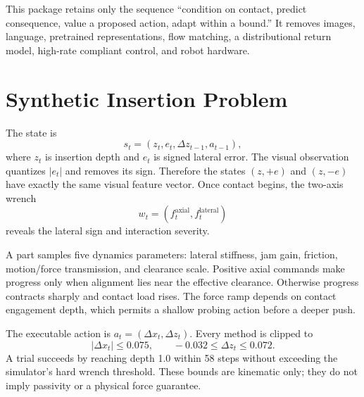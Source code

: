 \documentclass[11pt]{article}
\begin{document}
This package retains only the sequence ``condition on contact, predict consequence, value a proposed action, adapt within a bound.'' It removes images, language, pretrained representations, flow matching, a distributional return model, high-rate compliant control, and robot hardware.

\section{Synthetic Insertion Problem}
The state is
\[
  s_t = (z_t, e_t, \Delta z_{t-1}, a_{t-1}),
\]
where $z_t$ is insertion depth and $e_t$ is signed lateral error. The visual observation quantizes $|e_t|$ and removes its sign. Therefore the states $(z,+e)$ and $(z,-e)$ have exactly the same visual feature vector. Once contact begins, the two-axis wrench
\[
  w_t = (f^{\mathrm{axial}}_t, f^{\mathrm{lateral}}_t)
\]
reveals the lateral sign and interaction severity.

A part samples five dynamics parameters: lateral stiffness, jam gain, friction, motion/force transmission, and clearance scale. Positive axial commands make progress only when alignment lies near the effective clearance. Otherwise progress contracts sharply and contact load rises. The force ramp depends on contact engagement depth, which permits a shallow probing action before a deeper push.

The executable action is $a_t=(\Delta x_t,\Delta z_t)$. Every method is clipped to
\[
 |\Delta x_t|\leq 0.075, \qquad -0.032\leq \Delta z_t\leq 0.072.
\]
A trial succeeds by reaching depth 1.0 within 58 steps without exceeding the simulator's hard wrench threshold. These bounds are kinematic only; they do not imply passivity or a physical force guarantee.
\end{document}
